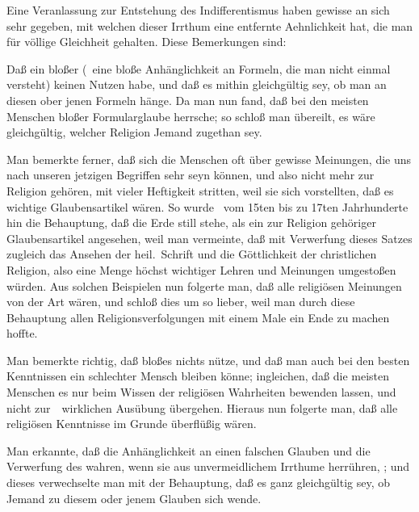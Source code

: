 \begin{aufza}
\begin{RWanm}
\end{RWanm}
\item Eine  Veranlassung zur Entstehung des Indifferentismus haben gewisse an sich sehr  gegeben, mit welchen dieser Irrthum eine entfernte Aehnlichkeit hat, die man für völlige Gleichheit gehalten. Diese Bemerkungen sind:
\begin{aufzb}
\item Daß ein bloßer  (\dh\ eine bloße Anhänglichkeit an Formeln, die man nicht einmal versteht) keinen Nutzen habe, und daß es mithin gleichgültig sey, ob man an diesen ober jenen Formeln hänge. Da man nun fand, daß bei den meisten Menschen bloßer Formularglaube herrsche; so schloß man übereilt, es wäre gleichgültig, welcher Religion Jemand zugethan sey.
\item Man bemerkte ferner, daß sich die Menschen oft über gewisse Meinungen, die uns nach unseren jetzigen Begriffen sehr  seyn können, und also nicht mehr zur Religion gehören, mit vieler Heftigkeit stritten, weil sie sich vorstellten, daß es wichtige Glaubensartikel wären. So wurde \zB\ vom 15ten bis zu 17ten Jahrhunderte hin die Behauptung, daß die Erde still stehe, als ein zur Religion gehöriger Glaubensartikel angesehen, weil man vermeinte, daß mit Verwerfung dieses Satzes zugleich das Ansehen der heil.\ Schrift und die Göttlichkeit der christlichen Religion, also eine Menge höchst wichtiger Lehren und Meinungen umgestoßen würden. Aus solchen Beispielen nun folgerte man, daß alle religiösen Meinungen von der Art wären, und schloß dies um so lieber, weil man durch diese Behauptung allen Religionsverfolgungen mit einem Male ein Ende zu machen hoffte.
\item Man bemerkte richtig, daß bloßes  nichts nütze, und daß man auch bei den besten Kenntnissen ein schlechter Mensch bleiben könne; ingleichen, daß die meisten Menschen es nur beim Wissen der religiösen Wahrheiten bewenden lassen, und nicht zur~\ wirklichen Ausübung übergehen. Hieraus nun folgerte man, daß alle religiösen Kenntnisse im Grunde überflüßig wären.
\item Man erkannte, daß die Anhänglichkeit an einen falschen Glauben und die Verwerfung des wahren, wenn sie aus unvermeidlichem Irrthume herrühren, ; und dieses verwechselte man mit der Behauptung, daß es ganz gleichgültig sey, ob Jemand zu diesem oder jenem Glauben sich wende.
\end{aufzb}

\end{aufza}
